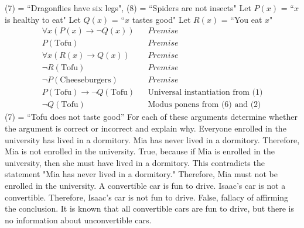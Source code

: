 \documentclass[12pt]{article}  %
\begin{document}
\newline
(7) = ``Dragonflies have six legs", (8) = ``Spiders are not insects"
\clearpage
{}\newline
Let $P(x)$ = ``$x$ is healthy to eat"\newline
Let $Q(x)$ = ``$x$ tastes good"\newline
Let $R(x)$ = ``You eat $x$"
\begin{align}
    \forall x(P(x)\to\neg{Q(x)})                & \textrm{} & Premise \\
    P(\textrm{Tofu})                            & \textrm{} & Premise \\
    \forall x(R(x)\to{Q(x)})                    & \textrm{} & Premise \\
    \neg{R(\textrm{Tofu})}                      & \textrm{} & Premise \\
    \neg{P(\textrm{Cheeseburgers})}             & \textrm{} & Premise \\
    P(\textrm{Tofu})\to\neg{Q(\textrm{Tofu})}   & \textrm{} & \textrm{Universal instantiation from (1)} \\
    \neg{Q(\textrm{Tofu})}                      & \textrm{} & \textrm{Modus ponens from (6) and (2)}
\end{align}
(7) = ``Tofu does not taste good''\newline
\newline
{}
\newline
For each of these arguments determine whether the argument is correct or incorrect and explain why.\newline
\newline
Everyone enrolled in the university has lived in a dormitory. Mia has never lived in a dormitory. Therefore, Mia is not enrolled in the university.\newline
True, because if Mia is enrolled in the university, then she must have lived in a dormitory. This contradicts the statement "Mia has never lived in a dormitory." Therefore, Mia must not be enrolled in the university.\newline
\newline
A convertible car is fun to drive. Isaac’s car is not a convertible. Therefore, Isaac’s car is not fun to drive.\newline
False, fallacy of affirming the conclusion. It is known that all convertible cars are fun to drive, but there is no information about unconvertible cars. \newline
\end{document}

